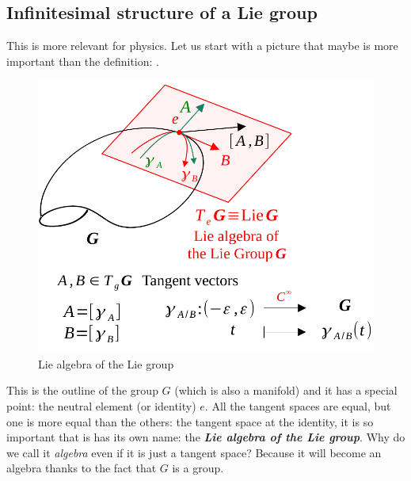 \documentclass[../main.tex]{subfiles}
\begin{document}
\subsection{Infinitesimal structure of a Lie group}
This is more relevant for physics. Let us start with a picture that maybe is more important than the definition: .
\begin{figure}[h!]
	\includegraphics{images/inf-struct-lie-group.pdf}
	\caption{Lie algebra of the Lie group}
\end{figure}
This is the outline of the group $G$ (which is also a manifold) and it has a special point: the neutral element (or identity) $e$. All the tangent spaces are equal, but one is more equal than the others: the tangent space at the identity, it is so important that is has its own name: the \textbf{\textit{Lie algebra of the Lie group}}. Why do we call it \textit{algebra} even if it is just a tangent space? Because it will become an algebra thanks to the fact that $G$ is a group.
\end{document}
